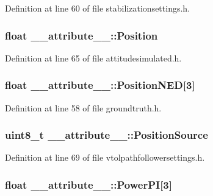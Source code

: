 \-Definition at line 60 of file stabilizationsettings.\-h.

\hypertarget{struct____attribute_____a16a9c3cd0cc40d544c8eef5231a78ca4}{
\subsubsection[{\-Position}]{\setlength{\rightskip}{0pt plus 5cm}float {\bf \-\_\-\-\_\-attribute\-\_\-\-\_\-\-::\-Position}}}\label{struct____attribute_____a16a9c3cd0cc40d544c8eef5231a78ca4}


\-Definition at line 65 of file attitudesimulated.\-h.

\hypertarget{struct____attribute_____af9dbc11fe6701c405946bac04ad858b4}{
\subsubsection[{\-Position\-N\-E\-D}]{\setlength{\rightskip}{0pt plus 5cm}float {\bf \-\_\-\-\_\-attribute\-\_\-\-\_\-\-::\-Position\-N\-E\-D}\mbox{[}3\mbox{]}}}\label{struct____attribute_____af9dbc11fe6701c405946bac04ad858b4}


\-Definition at line 58 of file groundtruth.\-h.

\hypertarget{struct____attribute_____ab0b1e986cf8d902d0183126f3b439918}{
\subsubsection[{\-Position\-Source}]{\setlength{\rightskip}{0pt plus 5cm}uint8\-\_\-t {\bf \-\_\-\-\_\-attribute\-\_\-\-\_\-\-::\-Position\-Source}}}\label{struct____attribute_____ab0b1e986cf8d902d0183126f3b439918}


\-Definition at line 69 of file vtolpathfollowersettings.\-h.

\hypertarget{struct____attribute_____a296acdb41fab2c3b8e30f0af8bd8f065}{
\subsubsection[{\-Power\-P\-I}]{\setlength{\rightskip}{0pt plus 5cm}float {\bf \-\_\-\-\_\-attribute\-\_\-\-\_\-\-::\-Power\-P\-I}\mbox{[}3\mbox{]}}}\label{struct____attribute_____a296acdb41fab2c3b8e30f0af8bd8f065}



